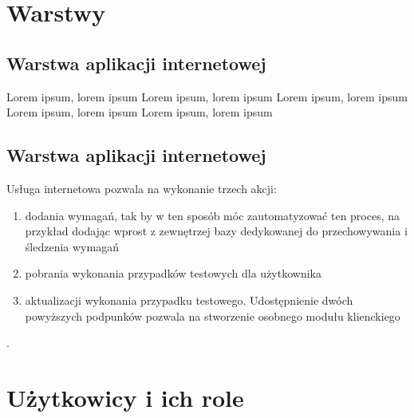 



\section{Warstwy}
\subsection{Warstwa aplikacji internetowej}
Lorem ipsum, lorem ipsum Lorem ipsum, lorem ipsum Lorem ipsum, lorem ipsum Lorem ipsum, lorem ipsum Lorem ipsum, lorem ipsum


\subsection{Warstwa aplikacji internetowej}
Usługa internetowa pozwala na wykonanie trzech akcji:
\begin{enumerate}
  \item dodania wymagań, tak by w ten sposób móc zautomatyzować ten proces, na przykład dodając wprost z zewnętrzej bazy dedykowanej do przechowywania i śledzenia wymagań
  \item pobrania wykonania przypadków testowych dla użytkownika
  \item aktualizacji wykonania przypadku testowego. Udostępnienie dwóch powyższych podpunków pozwala na stworzenie osobnego modułu klienckiego
\end{enumerate}.

\section{Użytkowicy i ich role}

